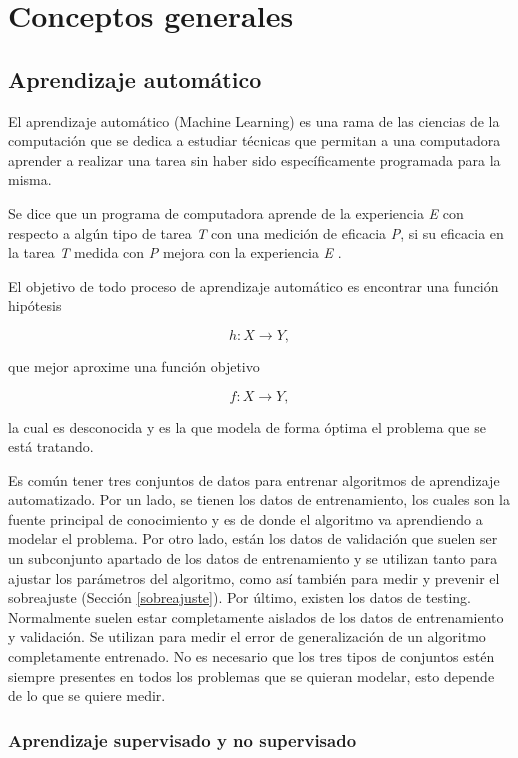 \documentclass[spanish]{report}
\begin{document}
\chapter{Conceptos generales}

\section{Aprendizaje automático}

El aprendizaje automático (Machine Learning) es una rama de las ciencias de la computación que se dedica a estudiar técnicas que permitan a una computadora aprender a realizar una tarea sin haber sido específicamente programada para la misma. 

Se dice que un programa de computadora aprende de la experiencia \textit{E} con respecto a algún tipo de tarea \textit{T} con una medición de eficacia \textit{P}, si su eficacia en la tarea \textit{T} medida con \textit{P} mejora con la experiencia \textit{E} \cite{Mitchell97a}.

El objetivo de todo proceso de aprendizaje automático es encontrar una función hipótesis

\[ h: X \rightarrow Y, \]

\noindent que mejor aproxime una función objetivo

\[ f: X \rightarrow Y, \]

\noindent la cual es desconocida y es la que modela de forma óptima el problema que se está tratando.

Es común tener tres conjuntos de datos para entrenar algoritmos de aprendizaje automatizado. Por un lado, se tienen los datos de entrenamiento, los cuales son la fuente principal de conocimiento y es de donde el algoritmo va aprendiendo a modelar el problema. Por otro lado, están los datos de validación que suelen ser un subconjunto apartado de los datos de entrenamiento y se utilizan tanto para ajustar los parámetros del algoritmo, como así también para medir y prevenir el sobreajuste (Sección \ref{sobreajuste}). Por último, existen los datos de testing. Normalmente suelen estar completamente aislados de los datos de entrenamiento y validación. Se utilizan para medir el error de generalización de un algoritmo completamente entrenado. No es necesario que los tres tipos de conjuntos estén siempre presentes en todos los problemas que se quieran modelar, esto depende de lo que se quiere medir.

\subsection{Aprendizaje supervisado y no supervisado}
\end{document}
